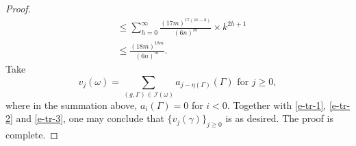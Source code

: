 \documentclass{amsart}
\theoremstyle{plain}
\theoremstyle{definition}
\theoremstyle{remark}
\begin{document}
\begin{proof}
\begin{equation}
\begin{aligned}
            &\leq\sum\limits_{h=0}^\infty\frac{(17m)^{17(m-h)}}{(6n)^{m}}\times k^{2h+1}\\
            &\leq \frac{(18m)^{18m}}{(6n)^{m}}.
        \end{aligned}
        \end{equation}
        Take  
        \begin{equation}\label{vje}
             v_j(\omega)=\sum\limits_{(g,\Gamma)\in\mathcal{I}(\omega)}a_{j-\eta(\Gamma)}(\Gamma)\text{ for } j\geq 0,
        \end{equation}
        where in the summation above, $a_i(\Gamma)=0$ for $i<0$. Together with \eqref{e-tr-1}, \eqref{e-tr-2} and \eqref{e-tr-3}, one may conclude that  $\{v_j(\gamma)\}_{j\geq 0}$ is as desired. The proof is complete.
\end{proof}
\end{document}
